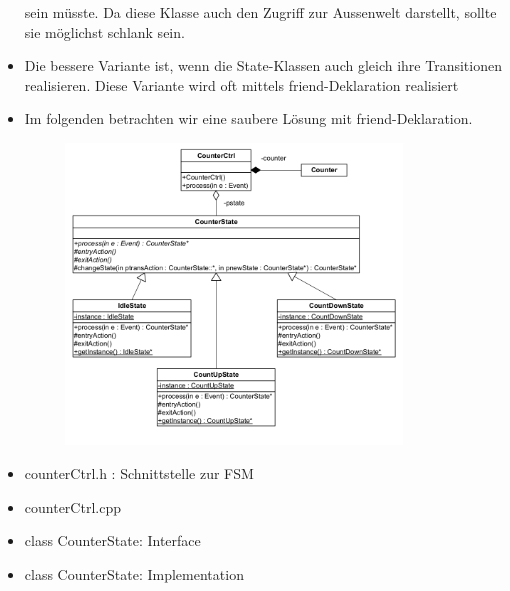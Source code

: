 \begin{itemize}
sein müsste. Da diese Klasse auch den Zugriff zur Aussenwelt darstellt, sollte
sie möglichst schlank sein.
\item Die bessere Variante ist, wenn die State-Klassen auch gleich ihre
Transitionen realisieren. Diese Variante wird oft mittels friend-Deklaration
realisiert
\item Im folgenden betrachten wir eine saubere Lösung mit friend-Deklaration.
 \begin{figure}[h]
  \centering
  \includegraphics[height=8cm]{images/FSM/klassendiagramm}  
\end{figure}
\item counterCtrl.h : Schnittstelle zur FSM


\item counterCtrl.cpp


\item class CounterState: Interface


\item class CounterState: Implementation


\end{itemize}

\newpage
